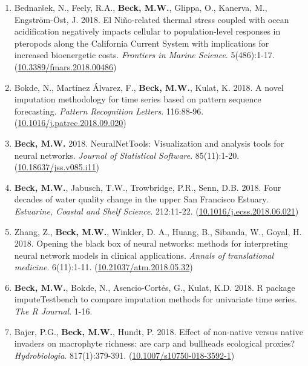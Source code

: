\documentclass[letterpaper,12pt]{article}
\begin{document}
\begin{enumerate}
\item Bednar\v{s}ek, N., Feely, R.A., \textbf{Beck, M.W.}, Glippa, O., Kanerva, M., Engstr\"{o}m-\"{O}st, J. 2018. El Ni\~{n}o-related thermal stress coupled with ocean acidification negatively impacts cellular to population-level responses in pteropods along the {C}alifornia {C}urrent {S}ystem with implications for increased bioenergetic costs. \textit{Frontiers in Marine Science}. 5(486):1-17. ({\footnotesize\href{https://doi.org/10.3389/fmars.2018.00486}{10.3389/fmars.2018.00486}})

\item Bokde, N., Mart\'{i}nez \'{A}lvarez, F., \textbf{Beck, M.W.}, Kulat, K. 2018. A novel imputation methodology for time series based on pattern sequence forecasting. \textit{Pattern Recognition Letters}. 116:88-96. ({\footnotesize\href{https://doi.org/10.1016/j.patrec.2018.09.020}{10.1016/j.patrec.2018.09.020}})

\item \textbf{Beck, M.W.} 2018. NeuralNetTools: Visualization and analysis tools for neural networks. \textit{Journal of Statistical Software}. 85(11):1-20. ({\footnotesize\href{http://dx.doi.org/10.18637/jss.v085.i11}{10.18637/jss.v085.i11}})

\item \textbf{Beck, M.W.}, Jabusch, T.W., Trowbridge, P.R., Senn, D.B. 2018. Four decades of water quality change in the upper San Francisco Estuary. \textit{Estuarine, Coastal and Shelf Science}. 212:11-22. ({\footnotesize\href{https://doi.org/10.1016/j.ecss.2018.06.021}{10.1016/j.ecss.2018.06.021}})

\item Zhang, Z., \textbf{Beck, M.W.}, Winkler, D. A., Huang, B., Sibanda, W., Goyal, H. 2018. Opening the black box of neural networks: methods for interpreting neural network models in clinical applications. \textit{Annals of translational medicine}. 6(11):1-11. ({\footnotesize\href{http://dx.doi.org/10.21037/atm.2018.05.32}{10.21037/atm.2018.05.32}})

\item \textbf{Beck, M.W.}, Bokde, N., Asencio-Cort\'{e}s, G., Kulat, K.D. 2018. R package imputeTestbench to compare imputation methods for univariate time series. \textit{The R Journal}. 1-16.

\item Bajer, P.G., \textbf{Beck, M.W.}, Hundt, P. 2018. Effect of non-native versus native invaders on macrophyte richness: are carp and bullheads ecological proxies? \textit{Hydrobiologia}. 817(1):379-391. ({\footnotesize\href{https://link.springer.com/article/10.1007/s10750-018-3592-1}{10.1007/s10750-018-3592-1}})


\end{enumerate}
\end{document}
